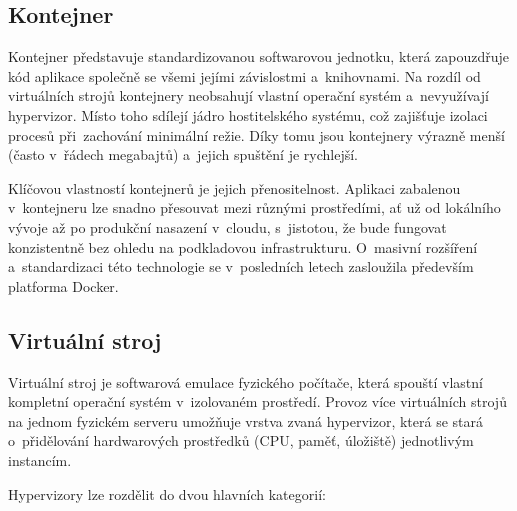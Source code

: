 \subsection{Kontejner}
Kontejner představuje standardizovanou softwarovou jednotku, která zapouzdřuje kód aplikace společně se všemi jejími závislostmi a~knihovnami. 
Na rozdíl od virtuálních strojů kontejnery neobsahují vlastní operační systém a~nevyužívají hypervizor. 
Místo toho sdílejí jádro hostitelského systému, což zajišťuje izolaci procesů při~zachování minimální režie. 
Díky tomu jsou kontejnery výrazně menší (často v~řádech megabajtů) a~jejich spuštění je rychlejší. \cite{redhatcontainers}

Klíčovou vlastností kontejnerů je jejich přenositelnost. Aplikaci zabalenou v~kontejneru lze snadno přesouvat mezi různými 
prostředími, ať už od lokálního vývoje až po produkční nasazení v~cloudu, s~jistotou, že bude fungovat konzistentně bez ohledu na podkladovou 
infrastrukturu. O~masivní rozšíření a~standardizaci této technologie se v~posledních letech zasloužila především platforma Docker.

\subsection{Virtuální stroj}
Virtuální stroj je softwarová emulace fyzického počítače, která spouští vlastní kompletní operační systém v~izolovaném prostředí. 
Provoz více virtuálních strojů na jednom fyzickém serveru umožňuje vrstva zvaná hypervizor, která se stará o~přidělování 
hardwarových prostředků (CPU, paměť, úložiště) jednotlivým instancím. \cite{redhatcontainers}

Hypervizory lze rozdělit do dvou hlavních kategorií:


